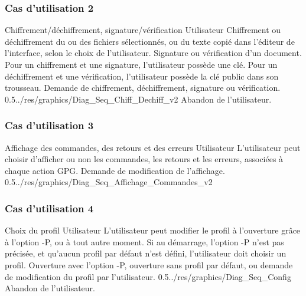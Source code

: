 \documentclass{../res/univ-projet}
\begin{document}
  \subsubsection{Cas d'utilisation 2}
\ficheGraphic
{Chiffrement/déchiffrement, signature/vérification}
{Utilisateur}
{Chiffrement ou déchiffrement du ou des fichiers sélectionnés, ou du texte copié dans l'éditeur de l'interface, selon le choix de l'utilisateur. Signature ou vérification d'un document.}
{Pour un chiffrement et une signature, l'utilisateur possède une clé. Pour un déchiffrement et une vérification, l'utilisateur possède la clé public dans son trousseau.}
{Demande de chiffrement, déchiffrement, signature ou vérification.}
{}
{0.5}{../res/graphics/Diag_Seq_Chiff_Dechiff_v2}
{Abandon de l'utilisateur.}
\vspace{0.5cm}

  \subsubsection{Cas d'utilisation 3}
\ficheGraphic
{Affichage des commandes, des retours et des erreurs}
{Utilisateur}
{L'utilisateur peut choisir d'afficher ou non les commandes, les retours et les erreurs, associées à chaque action GPG.}
{}
{Demande de modification de l'affichage.}
{}
{0.5}{../res/graphics/Diag_Seq_Affichage_Commandes_v2}
{}   
\vspace{0.5cm}

  \subsubsection{Cas d'utilisation 4}
\ficheGraphic
{Choix du profil}
{Utilisateur}
{L'utilisateur peut modifier le profil à l'ouverture grâce à l'option -P, ou à tout autre moment. Si au démarrage, l'option -P n'est pas précisée, et qu'aucun profil par défaut n'est défini, l'utilisateur doit choisir un profil.}
{}
{Ouverture avec l'option -P, ouverture sans profil par défaut, ou demande de modification du profil par l'utilisateur.}
{}
{0.5}{../res/graphics/Diag_Seq_Config}
{Abandon de l'utilisateur.}
\vspace{0.5cm}
\end{document}
